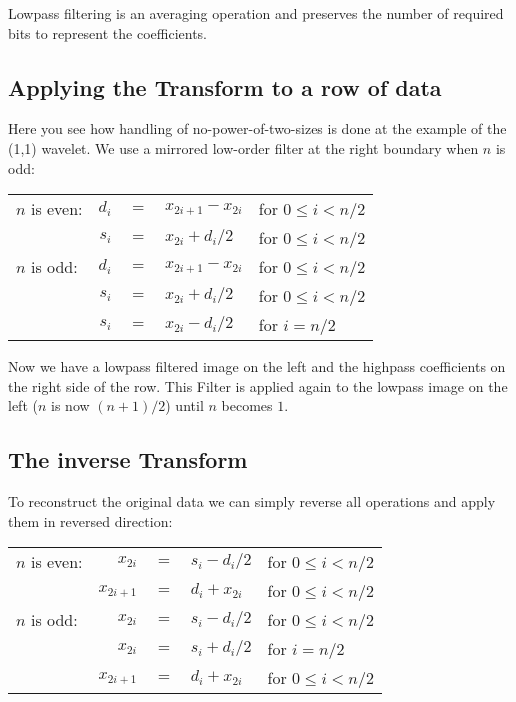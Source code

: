 Lowpass filtering is an averaging operation and preserves the number of 
required bits to represent the coefficients.



\subsection{ Applying the Transform to a row of data }

Here you see how handling of no-power-of-two-sizes is done at the example of the
(1,1) wavelet.
We use a mirrored low-order filter at the right boundary when $n$ is odd:


\begin{center}
\begin{tabular}{lrlll}
\hline
$n$ is even: & $d_{i}$ & $=$ & $x_{2i+1} - x_{2i}$     & for $0 \le i < n/2$ \\
             & $s_{i}$ & $=$ & $x_{2i} + d_{i} / 2$    & for $0 \le i < n/2$ \\
\hline
$n$ is odd:  & $d_{i}$ & $=$ & $x_{2i+1} - x_{2i}$     & for $0 \le i < n/2$ \\
             & $s_{i}$ & $=$ & $x_{2i} + d_{i} / 2$    & for $0 \le i < n/2$ \\
             & $s_{i}$ & $=$ & $x_{2i} - d_{i} / 2$    & for $i = n/2$       \\
\hline
\end{tabular}
\end{center}


Now we have a lowpass filtered image on the left and the highpass coefficients
on the right side of the row. This Filter is applied again to the lowpass image 
on the left ($n$ is now $(n+1)/2$) until $n$ becomes $1$. 



\subsection{ The inverse Transform }

To reconstruct the original data we can simply reverse all operations and apply
them in reversed direction:

\begin{center}
\begin{tabular}{lrlll}
\hline
$n$ is even: & $x_{2i}$ & $=$ & $s_{i} - d_{i} / 2$    &  for $0 \le i < n/2$ \\
             & $x_{2i+1}$ & $=$ & $d_{i} + x_{2i}$     &  for $0 \le i < n/2$ \\
\hline
$n$ is odd: & $x_{2i}$ & $=$ & $s_{i} - d_{i} / 2$    &  for $0 \le i < n/2$ \\
            & $x_{2i}$ & $=$ & $s_{i} + d_{i} / 2$    &  for $i = n/2$       \\
            & $x_{2i+1}$ & $=$ & $d_{i} + x_{2i}$     &  for $0 \le i < n/2$ \\
\hline
\end{tabular}
\end{center}


